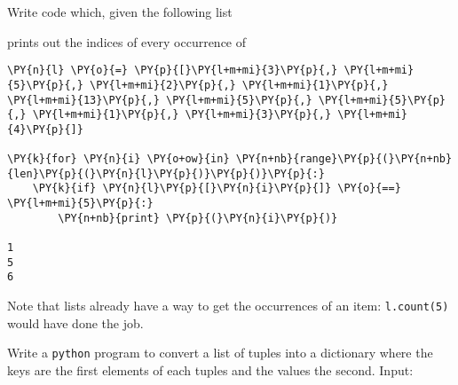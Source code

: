 \begin{Exercise}
Write code which, given the following list

\begin{Shaded}
\begin{Highlighting}[]
\OperatorTok{=}\NormalTok{ [}\NormalTok{, }\NormalTok{, }\NormalTok{, }\NormalTok{, }\NormalTok{, }\NormalTok{, }\NormalTok{, }\NormalTok{, }\NormalTok{, }\NormalTok{]}
\end{Highlighting}
\end{Shaded}
prints out the indices of every occurrence of
\begin{Shaded}
\begin{Highlighting}[]
\OperatorTok{=} 
\end{Highlighting}
\end{Shaded}
\end{Exercise}

\begin{Answer}
\begin{codebox}[size=fbox, boxrule=1pt, colback=cellbackground, colframe=cellborder]
\begin{Verbatim}[commandchars=\\\{\}]
\PY{n}{l} \PY{o}{=} \PY{p}{[}\PY{l+m+mi}{3}\PY{p}{,} \PY{l+m+mi}{5}\PY{p}{,} \PY{l+m+mi}{2}\PY{p}{,} \PY{l+m+mi}{1}\PY{p}{,} \PY{l+m+mi}{13}\PY{p}{,} \PY{l+m+mi}{5}\PY{p}{,} \PY{l+m+mi}{5}\PY{p}{,} \PY{l+m+mi}{1}\PY{p}{,} \PY{l+m+mi}{3}\PY{p}{,} \PY{l+m+mi}{4}\PY{p}{]}

\PY{k}{for} \PY{n}{i} \PY{o+ow}{in} \PY{n+nb}{range}\PY{p}{(}\PY{n+nb}{len}\PY{p}{(}\PY{n}{l}\PY{p}{)}\PY{p}{)}\PY{p}{:}
    \PY{k}{if} \PY{n}{l}\PY{p}{[}\PY{n}{i}\PY{p}{]} \PY{o}{==} \PY{l+m+mi}{5}\PY{p}{:}
        \PY{n+nb}{print} \PY{p}{(}\PY{n}{i}\PY{p}{)}

1
5
6
\end{Verbatim}
\end{codebox}

Note that lists already have a way to get the occurrences of an item: \texttt{l.count(5)} would have done the job.
\end{Answer}

\begin{Exercise}
Write a \texttt{python} program to convert a list of tuples into a dictionary where the keys are the first elements of each tuples and the values the second.
Input:
\begin{Shaded}
\begin{Highlighting}[]
\OperatorTok{=}\NormalTok{ [(}\NormalTok{, }\NormalTok{), (}\NormalTok{, }\NormalTok{), (}\NormalTok{, }\NormalTok{), (}\NormalTok{, }\NormalTok{), (}\NormalTok{, }\NormalTok{), (}\NormalTok{, }\NormalTok{)]}
\end{Highlighting}
\end{Shaded}
\end{Exercise}

